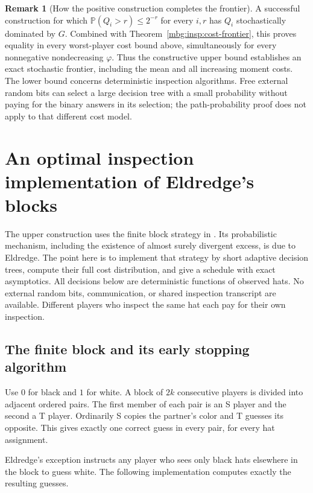 \documentclass[11pt,letterpaper]{article}
\theoremstyle{definition}
\newtheorem{remark}[theorem]{Remark}
\newcommand{\Prb}{\mathbb P}
\begin{document}
\begin{remark}[How the positive construction completes the frontier]
\label{mbg:insp:cost-attainment}
A successful construction for which
$\Prb(Q_i>r)\le2^{-r}$ for every $i,r$ has $Q_i$ stochastically
dominated by $G$.  Combined with Theorem~\ref{mbg:insp:cost-frontier}, this
proves equality in every worst-player cost bound above, simultaneously
for every nonnegative nondecreasing $\varphi$.  Thus the constructive
upper bound establishes an exact stochastic frontier, including the
mean and all increasing moment costs.  The lower bound concerns
deterministic inspection algorithms.  Free external random bits can
select a large decision tree with a small probability without paying
for the binary answers in its selection; the path-probability proof
does not apply to that different cost model.
\end{remark}


\section{An optimal inspection implementation of Eldredge's blocks}
\label{mbg:insp:con-section}

The upper construction uses the finite block strategy in
\cite[Proposition~6.6]{hat:Eldredge}.  Its probabilistic mechanism, including the
existence of almost surely divergent excess, is due to Eldredge.  The point
here is to implement that strategy by short adaptive decision trees, compute
their full cost distribution, and give a schedule with exact asymptotics.
All decisions below are deterministic functions of observed hats.  No
external random bits, communication, or shared inspection transcript are
available.  Different players who inspect the same hat each pay for their
own inspection.

\subsection{The finite block and its early stopping algorithm}

Use $0$ for black and $1$ for white.  A block of $2k$ consecutive players is
divided into adjacent ordered pairs.  The first member of each pair is an
S player and the second a T player.  Ordinarily S copies the partner's color
and T guesses its opposite.  This gives exactly one correct guess in every
pair, for every hat assignment.

Eldredge's exception instructs any player who sees only black hats elsewhere
in the block to guess white.  The following implementation computes exactly
the resulting guesses.
\end{document}
